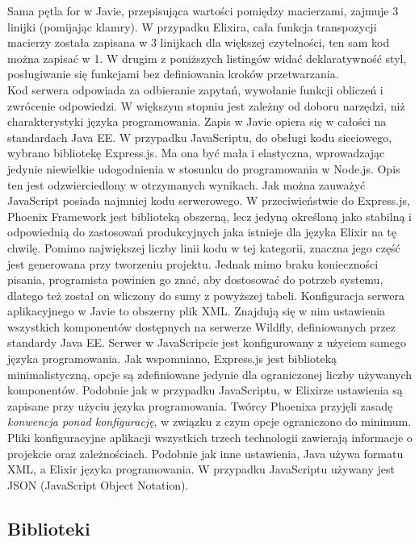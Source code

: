 \documentclass[12pt,twoside]{article}
\begin{document}
Sama pętla for w Javie, przepisująca wartości pomiędzy macierzami,
zajmuje 3 linijki (pomijając klamry). W przypadku Elixira, cała funkcja
transpozycji macierzy została zapisana w 3 linijkach dla większej
czytelności, ten sam kod można zapisać w 1. W drugim z poniższych
listingów widać deklaratywność styl, posługiwanie się funkcjami bez
definiowania kroków przetwarzania.\\
Kod serwera odpowiada za odbieranie zapytań, wywołanie funkcji obliczeń
i zwrócenie odpowiedzi. W większym stopniu jest zależny od doboru
narzędzi, niż charakterystyki języka programowania. Zapis w Javie opiera
się w całości na standardach Java EE. W przypadku JavaScriptu, do
obsługi kodu sieciowego, wybrano bibliotekę Express.js. Ma ona być mała
i elastyczna, wprowadzając jedynie niewielkie udogodnienia w stosunku do
programowania w Node.js. Opis ten jest odzwierciedlony w otrzymanych
wynikach. Jak można zauważyć JavaScript posiada najmniej kodu
serwerowego. W przeciwieństwie do Express.js, Phoenix Framework jest
biblioteką obszerną, lecz jedyną określaną jako stabilną i odpowiednią
do zastosowań produkcyjnych jaka istnieje dla języka Elixir na tę
chwilę. Pomimo największej liczby linii kodu w tej kategorii, znaczna
jego część jest generowana przy tworzeniu projektu. Jednak mimo braku
konieczności pisania, programista powinien go znać, aby dostosować do
potrzeb systemu, dlatego też został on wliczony do sumy z powyższej
tabeli. Konfiguracja serwera aplikacyjnego w Javie to obszerny plik XML.
Znajdują się w nim ustawienia wszystkich komponentów dostępnych na
serwerze Wildfly, definiowanych przez standardy Java EE. Serwer w
JavaScripcie jest konfigurowany z użyciem samego języka programowania.
Jak wspomniano, Express.js jest biblioteką minimalistyczną, opcje są
zdefiniowane jedynie dla ograniczonej liczby używanych komponentów.
Podobnie jak w przypadku JavaScriptu, w Elixirze ustawienia są zapisane
przy użyciu języka programowania. Twórcy Phoenixa przyjęli zasadę
\emph{konwencja ponad konfigurację}, w związku z czym opcje ograniczono
do minimum.\\
Pliki konfiguracyjne aplikacji wszystkich trzech technologii zawierają
informacje o projekcie oraz zależnościach. Podobnie jak inne ustawienia,
Java używa formatu XML, a Elixir języka programowania. W przypadku
JavaScriptu używany jest JSON (JavaScript Object Notation).

\subsection{Biblioteki}\label{biblioteki}
\end{document}
